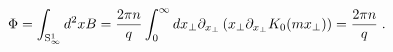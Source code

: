 \begin{equation}
\Phi =\int_{\mathrm{S}_{\infty }^{1}}d^{2}xB=\frac{2\pi n}{q}%
\int_{0}^{\infty }dx_{\mathrm{\bot }}\partial _{x_{\mathrm{\bot }}}\left( x_{%
\mathrm{\bot }}\partial _{x_{\mathrm{\bot }}}K_{0}(mx_{\mathrm{\bot }%
})\right) =\frac{2\pi n}{q}\;.  \label{fl}
\end{equation}

